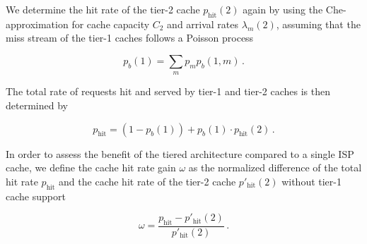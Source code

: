 We determine the hit rate of the tier-2 cache $p_\text{hit}(2)$ again by using the Che-approximation for cache capacity $C_2$ and arrival rates $\lambda_m(2)$, assuming that the miss stream of the tier-1 caches follows a Poisson process

\begin{equation}
	p_b(1) = \sum_m p_m p_{b}(1,m) \, .
\end{equation}

The total rate of requests hit and served by tier-1 and tier-2 caches is then determined by

\begin{equation}
	p_\text{hit} = (1-p_b(1)) + p_b(1)\cdot p_\text{hit}(2) \, .
\end{equation}

In order to assess the benefit of the tiered architecture compared to a single ISP cache, we define the cache hit rate gain $\omega$ as the normalized difference of the total hit rate $p_\text{hit}$ and the cache hit rate of the tier-2 cache $p'_\text{hit}(2)$ without tier-1 cache support

\begin{equation}
\omega = \frac{p_\text{hit}-p'_\text{hit}(2)}{p'_\text{hit}(2)} \, .
\end{equation}


